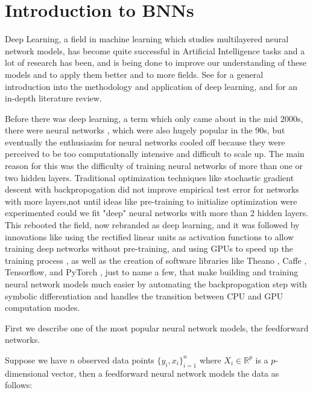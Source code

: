 \documentclass[12pt]{report}
\begin{document}
\section{Introduction to BNNs}

Deep Learning, a field in machine learning which studies multilayered neural network models, has become quite successful in Artificial Intelligence tasks and a lot of research has been, and is being done to improve our understanding of these models and to apply them better and to more fields. See \cite{Goodfellow-et-al-2016-Book,lecun2015deep} for a general introduction into the methodology and application of deep learning, and \cite{schmidhuber2015deep} for an in-depth literature review. 

Before there was deep learning, a term which only came about in the mid 2000s, there were neural networks \cite{bishop1995neural,ripley2007pattern}, which were also hugely popular in the 90s, but eventually the enthusiasim for neural networks cooled off because they were perceived to be too computationally intensive and difficult to scale up. The main reason for this was the difficulty of training neural networks of more than one or two hidden layers. Traditional optimization techniques like stochastic gradient descent with backpropogation did not improve empirical test error for networks with more layers,not until ideas like pre-training to initialize optimization were experimented could we fit "deep" neural networks with more than 2 hidden layers. This rebooted the field, now rebranded as deep learning, and it was followed by innovations like using the rectified linear units as activation functions \cite{nair2010rectified} to allow training deep networks without pre-training, and using GPUs to speed up the training process \cite{krizhevsky2012imagenet}, as well as the creation of software libraries like Theano \cite{bergstra2010theano}, Caffe \cite{jia2014caffe}, Tensorflow\cite{tensorflow2015-whitepaper}, and PyTorch \cite{paszke2017automatic}, just to name a few, that make building and training neural network models much easier by automating the backpropogation step with symbolic differentiation \cite{bahrampour2015comparative} and handles the transition between CPU and GPU computation modes. 

First we describe one of the most popular neural network models, the feedforward networks.

Suppose we have $n$ observed data points $\{y_i,x_i\}_{i=1}^n$ where $X_i \in
\mathbb{R}^p$ is a $p$-dimensional vector, then a feedforward neural network models the
data as follows:
\end{document}
